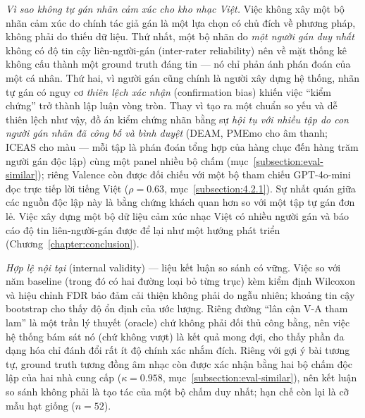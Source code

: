 \documentclass[../DoAn.tex]{subfiles}
\begin{document}
\textit{Vì sao không tự gán nhãn cảm xúc cho kho nhạc Việt.} Việc không xây một bộ nhãn cảm xúc do chính tác giả gán là một lựa chọn có chủ đích về phương pháp, không phải do thiếu dữ liệu. Thứ nhất, một bộ nhãn do \emph{một người gán duy nhất} không có độ tin cậy liên-người-gán (inter-rater reliability) nên về mặt thống kê không cấu thành một ground truth đáng tin --- nó chỉ phản ánh phán đoán của một cá nhân. Thứ hai, vì người gán cũng chính là người xây dựng hệ thống, nhãn tự gán có nguy cơ \emph{thiên lệch xác nhận} (confirmation bias) khiến việc ``kiểm chứng'' trở thành lập luận vòng tròn. Thay vì tạo ra một chuẩn so yếu và dễ thiên lệch như vậy, đồ án kiểm chứng nhãn bằng sự \emph{hội tụ với nhiều tập do con người gán nhãn đã công bố và bình duyệt} (DEAM, PMEmo cho âm thanh; ICEAS cho màu --- mỗi tập là phán đoán tổng hợp của hàng chục đến hàng trăm người gán độc lập) cùng một panel nhiều bộ chấm (mục~\ref{subsection:eval-similar}); riêng Valence còn được đối chiếu với một bộ tham chiếu GPT-4o-mini đọc trực tiếp lời tiếng Việt ($\rho = 0.63$, mục~\ref{subsection:4.2.1}). Sự nhất quán giữa các nguồn độc lập này là bằng chứng khách quan hơn so với một tập tự gán đơn lẻ. Việc xây dựng một bộ dữ liệu cảm xúc nhạc Việt có nhiều người gán và báo cáo độ tin liên-người-gán được để lại như một hướng phát triển (Chương~\ref{chapter:conclusion}).

\textit{Hợp lệ nội tại} (internal validity) --- liệu kết luận so sánh có vững. Việc so với năm baseline (trong đó có hai đường loại bỏ từng trục) kèm kiểm định Wilcoxon và hiệu chỉnh FDR bảo đảm cải thiện không phải do ngẫu nhiên; khoảng tin cậy bootstrap cho thấy độ ổn định của ước lượng. Riêng đường ``lân cận V-A tham lam'' là một trần lý thuyết (oracle) chứ không phải đối thủ công bằng, nên việc hệ thống bám sát nó (chứ không vượt) là kết quả mong đợi, cho thấy phần đa dạng hóa chỉ đánh đổi rất ít độ chính xác nhắm đích. Riêng với gợi ý bài tương tự, ground truth tương đồng âm nhạc còn được xác nhận bằng hai bộ chấm độc lập của hai nhà cung cấp ($\kappa = 0.958$, mục~\ref{subsection:eval-similar}), nên kết luận so sánh không phải là tạo tác của một bộ chấm duy nhất; hạn chế còn lại là cỡ mẫu hạt giống ($n = 52$).
\end{document}
